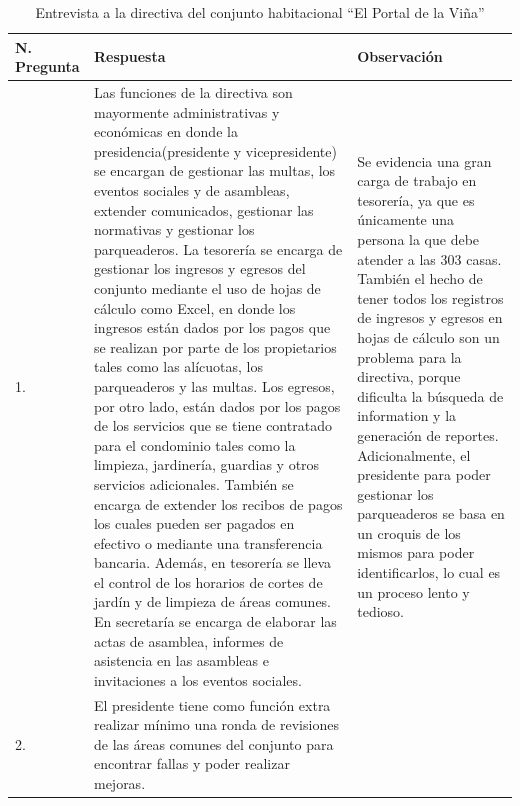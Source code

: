 \newpage
\begin{footnotesize}
\begin{center}


    \begin{longtable}[c]{|p{} |p{} |p{}|}
        \caption{Entrevista a la directiva del conjunto habitacional {\textquotedblleft}El Portal de la Viña{\textquotedblright}}\\
        \hline
        \textbf{N. Pregunta} & \textbf{Respuesta} & \textbf{Observación}\\
        \hline
            1. & Las funciones de la directiva son mayormente administrativas y económicas en donde la presidencia(presidente y vicepresidente) se encargan de gestionar las multas, los eventos sociales y de asambleas, extender comunicados, gestionar las normativas y gestionar los parqueaderos.
            La tesorería se encarga de gestionar los ingresos y egresos del conjunto mediante el uso de hojas de cálculo como Excel, en donde los ingresos están dados por los pagos que se realizan por parte de los propietarios tales como las alícuotas, los parqueaderos y las multas.
            Los egresos, por otro lado, están dados por los pagos de los servicios que se tiene contratado para el condominio tales como la limpieza, jardinería, guardias y otros servicios adicionales.
            También se encarga de extender los recibos de pagos los cuales pueden ser pagados en efectivo o mediante una transferencia bancaria.
            Además, en tesorería se lleva el control de los horarios de cortes de jardín y de limpieza de áreas comunes.
            En secretaría se encarga de elaborar las actas de asamblea, informes de asistencia en las asambleas e invitaciones a los eventos sociales.
            & Se evidencia una gran carga de trabajo en tesorería, ya que es únicamente una persona la que debe atender a las 303 casas.
            También el hecho de tener todos los registros de ingresos y egresos en hojas de cálculo son un problema para la directiva, porque dificulta la búsqueda de information y la generación de reportes.
            Adicionalmente, el presidente para poder gestionar los parqueaderos se basa en un croquis de los mismos para poder identificarlos, lo cual es un proceso lento y tedioso.\\
        \hline
        2. & El presidente tiene como función extra realizar mínimo una ronda de revisiones de las áreas comunes del conjunto para encontrar fallas y poder realizar mejoras.

\end{longtable}
\end{center}
\end{footnotesize}
